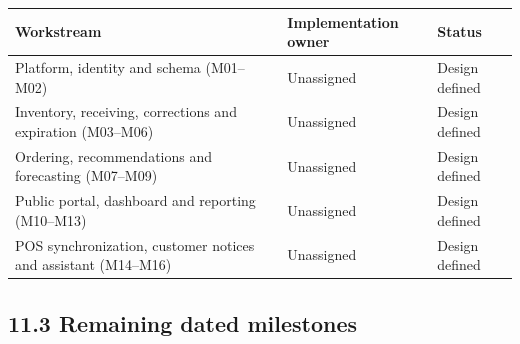 {\def\LTcaptype{none} %
\begin{longtable}[]{|
  >{\raggedright\arraybackslash}m{}|
  >{\raggedright\arraybackslash}m{}|
  >{\raggedright\arraybackslash}m{}|}
\hline
\begin{minipage}[c]{\linewidth}\raggedright
\textbf{Workstream}
\end{minipage} & \begin{minipage}[c]{\linewidth}\raggedright
\textbf{Implementation owner}
\end{minipage} & \begin{minipage}[c]{\linewidth}\raggedright
\textbf{Status}
\end{minipage} \\
\hline
\endhead

\endlastfoot
Platform, identity and schema (M01--M02) & Unassigned & Design defined \\ \hline
Inventory, receiving, corrections and expiration (M03--M06) & Unassigned & Design defined \\ \hline
Ordering, recommendations and forecasting (M07--M09) & Unassigned & Design defined \\ \hline
Public portal, dashboard and reporting (M10--M13) & Unassigned & Design defined \\ \hline
POS synchronization, customer notices and assistant (M14--M16) & Unassigned & Design defined \\ \hline
\end{longtable}
}

\subsection{11.3 Remaining dated milestones}\label{remaining-dated-milestones}

